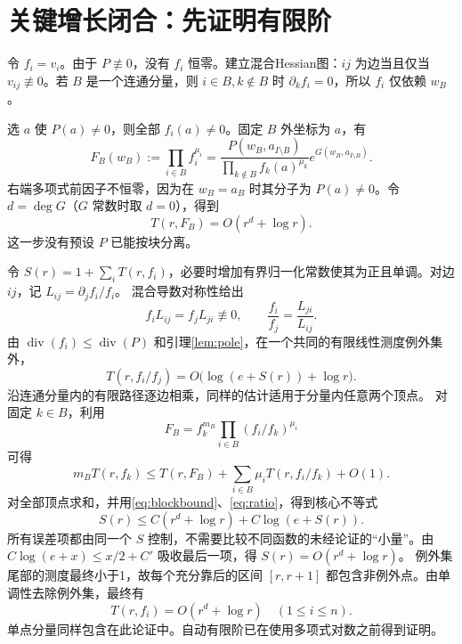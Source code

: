 \documentclass[UTF8,a4paper,zihao=-4,fontset=none]{ctexart}
\numberwithin{equation}{section}
\theoremstyle{definition}
\theoremstyle{definition}\newtheorem{definition}[theorem]{定义}
\newcommand{\Div}{\operatorname{div}}
\begin{document}
\section{关键增长闭合：先证明有限阶}
令 $f_i=v_i$。由于 $P\not\equiv0$，没有 $f_i$ 恒零。建立混合Hessian图：$ij$ 为边当且仅当 $v_{ij}\not\equiv0$。若 $B$ 是一个连通分量，则 $i\in B,k\notin B$ 时 $\partial_kf_i=0$，所以 $f_i$ 仅依赖 $w_B$。

选 $a$ 使 $P(a)\ne0$，则全部 $f_i(a)\ne0$。固定 $B$ 外坐标为 $a$，有
\begin{equation}\label{eq:blockprod}
 F_B(w_B):=\prod_{i\in B}f_i^{\mu_i}
 =\frac{P(w_B,a_{I\setminus B})}
 {\prod_{k\notin B}f_k(a)^{\mu_k}}
 e^{G(w_B,a_{I\setminus B})}.
\end{equation}
右端多项式前因子不恒零，因为在 $w_B=a_B$ 时其分子为 $P(a)\ne0$。令 $d=\deg G$（$G$ 常数时取 $d=0$），得到
\begin{equation}\label{eq:blockbound}
 T(r,F_B)=O(r^d+\log r).
\end{equation}
这一步没有预设 $P$ 已能按块分离。

令 $S(r)=1+\sum_iT(r,f_i)$，必要时增加有界归一化常数使其为正且单调。对边 $ij$，记 $L_{ij}=\partial_jf_i/f_i$。
混合导数对称性给出
\[
 f_iL_{ij}=f_jL_{ji}\not\equiv0,
 \qquad\frac{f_i}{f_j}=\frac{L_{ji}}{L_{ij}}.
\]
由 $\Div(f_i)\le\Div(P)$ 和引理\ref{lem:pole}，在一个共同的有限线性测度例外集外，
\begin{equation}\label{eq:ratio}
 T(r,f_i/f_j)=O\bigl(\log(e+S(r))+\log r\bigr).
\end{equation}
沿连通分量内的有限路径逐边相乘，同样的估计适用于分量内任意两个顶点。
对固定 $k\in B$，利用
\[
 F_B=f_k^{m_B}\prod_{i\in B}(f_i/f_k)^{\mu_i}
\]
可得
\[
 m_BT(r,f_k)\le T(r,F_B)+\sum_{i\in B}\mu_iT(r,f_i/f_k)+O(1).
\]
对全部顶点求和，并用\eqref{eq:blockbound}、\eqref{eq:ratio}，得到核心不等式
\begin{equation}\label{eq:absorb}
 S(r)\le C(r^d+\log r)+C\log(e+S(r)).
\end{equation}
所有误差项都由同一个 $S$ 控制，不需要比较不同函数的未经论证的“小量”。由
$C\log(e+x)\le x/2+C'$ 吸收最后一项，得 $S(r)=O(r^d+\log r)$。
例外集尾部的测度最终小于1，故每个充分靠后的区间 $[r,r+1]$ 都包含非例外点。由单调性去除例外集，最终有
\begin{equation}\label{eq:finite}
 T(r,f_i)=O(r^d+\log r)\quad(1\le i\le n).
\end{equation}
单点分量同样包含在此论证中。自动有限阶已在使用多项式对数之前得到证明。
\end{document}
